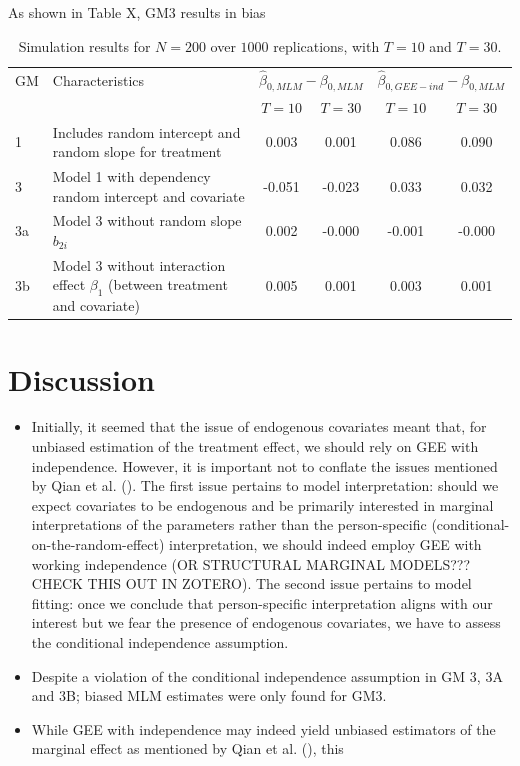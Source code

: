 \documentclass[
  12pt,
  a4paper,
]{article}
\begin{document}
As shown in Table X, GM3 results in bias

\begin{table}[H]
    \caption{Simulation results for $N=200$ over $1000$ replications, with $T=10$ and $T=30$.}
    \centering
    \begin{tabular}{@{}p{1.5cm} p{5cm} cc cc@{}}
        \toprule
        GM & Characteristics & \multicolumn{2}{c}{$\hat{\beta}_{0,MLM}-\beta_{0,MLM}$} & \multicolumn{2}{c}{$\hat{\beta}_{0,GEE-ind}-\beta_{0,MLM}$} \\ 
        \cmidrule(lr){3-4} \cmidrule(lr){5-6}
           &                 & \( T = 10 \) & \( T = 30 \) & \( T = 10 \) & \( T = 30 \) \\ \midrule
        1  & Includes random intercept and random slope for treatment & 0.003 & 0.001 & 0.086 & 0.090 \\
        3  & Model 1 with dependency random intercept and covariate       & -0.051 & -0.023 & 0.033 & 0.032 \\
        3a & Model 3 without random slope $b_{2i}$           & 0.002 & -0.000 & -0.001 & -0.000 \\
        3b & Model 3 without interaction effect $\beta_1$ (between treatment and covariate) & 0.005 & 0.001 & 0.003 & 0.001 \\
        \bottomrule
    \end{tabular}
\end{table}

\section{Discussion}\label{discussion}

\begin{itemize}
\item
  Initially, it seemed that the issue of endogenous covariates meant
  that, for unbiased estimation of the treatment effect, we should rely
  on GEE with independence. However, it is important not to conflate the
  issues mentioned by Qian et al. (). The
  first issue pertains to model interpretation: should we expect
  covariates to be endogenous and be primarily interested in marginal
  interpretations of the parameters rather than the person-specific
  (conditional-on-the-random-effect) interpretation, we should indeed
  employ GEE with working independence (OR STRUCTURAL MARGINAL MODELS???
  CHECK THIS OUT IN ZOTERO). The second issue pertains to model fitting:
  once we conclude that person-specific interpretation aligns with our
  interest but we fear the presence of endogenous covariates, we have to
  assess the conditional independence assumption.
\item
  Despite a violation of the conditional independence assumption in GM
  3, 3A and 3B; biased MLM estimates were only found for GM3.
\item
  While GEE with independence may indeed yield unbiased estimators of
  the marginal effect as mentioned by Qian et al.
  (), this
\end{itemize}
\end{document}
